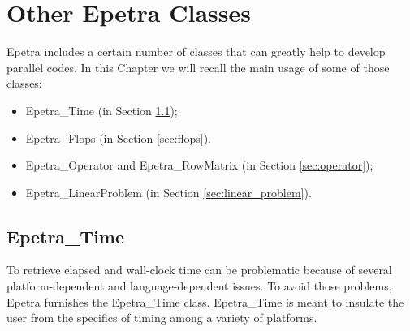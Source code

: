 % 
% 
% 
%   
%   
% 
% 

\chapter{Other Epetra Classes}
\label{chap:epetra_others}

Epetra includes a certain number of classes that can greatly help to
develop parallel codes. In this Chapter we will recall the main
usage of some of those classes:
\begin{itemize}
\item Epetra\_Time (in Section \ref{sec:time});
\item Epetra\_Flops (in Section \ref{sec:flops}).
\item Epetra\_Operator and Epetra\_RowMatrix (in Section \ref{sec:operator});
\item Epetra\_LinearProblem (in Section \ref{sec:linear_problem}).
\end{itemize}


\section{Epetra\_Time}
\label{sec:time}

To retrieve elapsed and wall-clock time can be problematic because of
several platform-dependent and language-dependent issues. To avoid those
problems, Epetra furnishes the Epetra\_Time class.  Epetra\_Time is
meant to insulate the user from the specifics of timing among a variety
of platforms.

